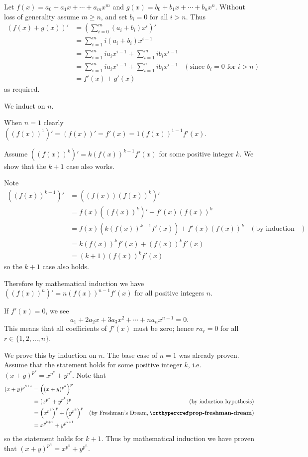 \begin{questions}
    \item Let $f(x) = a_0 + a_1x + \cdots + a_mx^m$ and $g(x) = b_0 + b_1x + \cdots + b_nx^n$. Without loss of generality assume $m \geq n$, and set $b_i = 0$ for all $i > n$. Thus
    \begin{align*}
        (f(x) + g(x))' &= \left(\sum_{i=0}^m(a_i + b_i)x^i\right)'\\
        &= \sum_{i=1}^m i(a_i+b_i)x^{i-1}\\
        &= \sum_{i=1}^m ia_ix^{i-1} + \sum_{i=1}^m ib_ix^{i-1}\\
        &= \sum_{i=1}^m ia_ix^{i-1} + \sum_{i=1}^n ib_ix^{i-1} & (\text{since } b_i = 0 \text{ for } i > n)\\
        &= f'(x) + g'(x)
    \end{align*}
    as required.

    \item We induct on $n$.

    When $n = 1$ clearly $((f(x))^1)' = (f(x))' = f'(x) = 1(f(x))^{1-1}f'(x)$.

    Assume $((f(x))^k)' = k(f(x))^{k-1}f'(x)$ for some positive integer $k$. We show that the $k+1$ case also works.

    Note
    \begin{align*}
        ((f(x))^{k+1})' &= ((f(x))(f(x))^k)'\\
        &= f(x)((f(x))^k)' + f'(x)(f(x))^k\\
        &= f(x)(k(f(x))^{k-1}f'(x)) + f'(x)(f(x))^k & (\text{by induction hypothesis})\\
        &= k(f(x))^kf'(x) + (f(x))^kf'(x)\\
        &= (k+1)(f(x))^kf'(x)
    \end{align*}
    so the $k+1$ case also holds.

    Therefore by mathematical induction we have $((f(x))^n)' = n(f(x))^{n-1}f'(x)$ for all positive integers $n$.

    \item If $f'(x) = 0$, we see
    \[
        a_1 + 2a_2x + 3a_3x^2 + \cdots + na_nx^{n-1} = 0.
    \]
    This means that all coefficients of $f'(x)$ must be zero; hence $ra_r = 0$ for all $r \in \{1, 2, \dots, n\}$.

    \item We prove this by induction on $n$. The base case of $n = 1$ was already proven. Assume that the statement holds for some positive integer $k$, i.e. $(x+y)^{p^k} = x^{p^k} + y^{p^k}$. Note that
    \begin{align*}
        (x+y)^{p^{k+1}} &= \left((x+y)^{p^k}\right)^p\\
        &= (x^{p^k}+y^{p^k})^p & (\text{by induction hypothesis})\\
        &= \left(x^{p^k}\right)^p + \left(y^{p^k}\right)^p & (\text{by Freshman's Dream}, \myref{prop-freshman-dream})\\
        &= x^{p^{k+1}} + y^{p^{k+1}}
    \end{align*}
    so the statement holds for $k + 1$. Thus by mathematical induction we have proven that $(x+y)^{p^n} = x^{p^n} + y^{p^n}$.
\end{questions}


